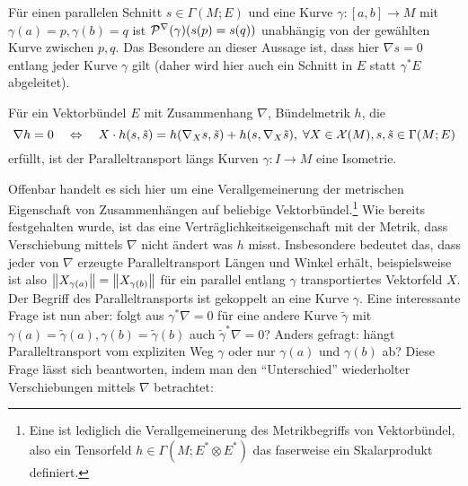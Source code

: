 \begin{bsp}
Für einen parallelen Schnitt $s \in \Gamma(M; E)$ und eine Kurve $\gamma: [a, b] \rightarrow M$ mit $\gamma(a) = p, \gamma(b) = q$ ist $\mathcal{P}^\nabla(\gamma)\qty(s(p) = s(q))$ unabhängig von der gewählten Kurve zwischen $p, q$. Das Besondere an dieser Aussage ist, dass hier $\nabla s = 0$ entlang jeder Kurve $\gamma$ gilt (daher wird hier auch ein Schnitt in $E$ statt $\gamma^* E$ abgeleitet).
\end{bsp}



\begin{lemma}
Für ein Vektorbündel $E$ mit Zusammenhang $\nabla$, Bündelmetrik $h$, die
\begin{equation}
\nabla h = 0 \quad \Leftrightarrow \quad X \cdot h(s, \tilde{s}) = h\qty(\nabla_X s, \tilde{s}) + h\qty(s, \nabla_X \tilde{s}), \; \forall X \in \mathcal{X}(M), s, \tilde{s} \in \Gamma(M; E)
\end{equation}
erfüllt, ist der Paralleltransport längs Kurven $\gamma: I \rightarrow M$ eine Isometrie.
\end{lemma}

Offenbar handelt es sich hier um eine Verallgemeinerung der metrischen Eigenschaft von Zusammenhängen auf beliebige Vektorbündel.\footnote{Eine  ist lediglich die Verallgemeinerung des Metrikbegriffs von Vektorbündel, also ein Tensorfeld $h \in \Gamma(M; E^* \otimes E^*)$ das faserweise ein Skalarprodukt definiert.} Wie bereits festgehalten wurde, ist das eine Verträglichkeitseigenschaft mit der Metrik, dass Verschiebung mittels $\nabla$ nicht ändert was $h$ misst. Insbesondere bedeutet das, dass jeder von $\nabla$ erzeugte Paralleltransport Längen und Winkel erhält, beispielsweise ist also $\norm{X_{\gamma(a)}} = \norm{X_{\gamma(b)}}$ für ein parallel entlang $\gamma$ transportiertes Vektorfeld $X$.\\%



Der Begriff des Paralleltransports ist gekoppelt an eine Kurve $\gamma$. Eine interessante Frage ist nun aber: folgt aus $\gamma^* \nabla = 0$ für eine andere Kurve $\tilde{\gamma}$ mit $\gamma(a) = \tilde{\gamma}(a), \gamma(b) = \tilde{\gamma}(b)$ auch $\tilde{\gamma}^* \nabla = 0$? Anders gefragt: hängt Paralleltransport vom expliziten Weg $\gamma$ oder nur $\gamma(a)$ und $\gamma(b)$ ab? Diese Frage lässt sich beantworten, indem man den \enquote{Unterschied} wiederholter Verschiebungen mittels $\nabla$ betrachtet:

